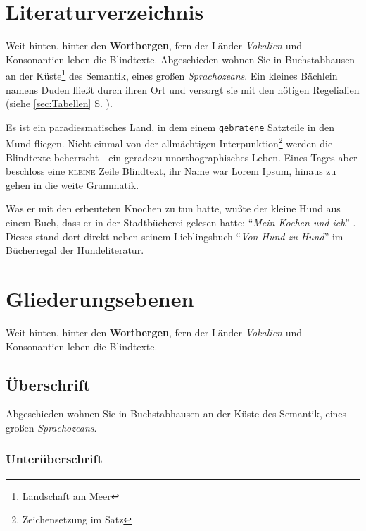 \documentclass[%
	12pt,%
	a4paper,%
	oneside,%
	listof=totoc,
 	index=totoc,
	bibliography = totoc,
	parskip = half,%
	chapterprefix=false,%
	appendixprefix, %
headings=small,%
]{scrreprt}
\begin{document}
\chapter{Literaturverzeichnis}
\label{sec:Literaturverzeichnis}

Weit hinten, hinter den \textbf{Wortbergen}, fern der Länder \textit{Vokalien} und Konsonantien leben die Blindtexte. Abgeschieden wohnen Sie in Buchstabhausen an der Küste\footnote{Landschaft am Meer}
des Semantik, eines großen \textsl{Sprachozeans}. Ein kleines Bächlein namens Duden fließt durch ihren Ort und versorgt sie mit den nötigen Regelialien (siehe \ref{sec:Tabellen} S. \pageref{sec:Tabellen}).

Es ist ein paradiesmatisches Land, in dem einem \texttt{gebratene} Satzteile in den Mund fliegen. Nicht einmal von der allmächtigen Interpunktion\footnote{Zeichensetzung im Satz} werden die Blindtexte beherrscht - ein geradezu unorthographisches Leben. Eines Tages aber beschloss eine \textsc{kleine} Zeile Blindtext, ihr Name war Lorem Ipsum, hinaus zu gehen in die weite Grammatik. 

Was er mit den erbeuteten Knochen zu tun hatte, wußte der kleine Hund aus einem Buch, dass er in der Stadtbücherei
gelesen hatte: "`\emph{Mein Kochen und ich}"' \cite{ansorge:1999}. Dieses stand dort direkt neben seinem Lieblingsbuch
"`\emph{Von Hund zu Hund}"' \cite{balzert:SWT1} im Bücherregal der Hundeliteratur.

\chapter{Gliederungsebenen}
\label{sec:Gliederung}

Weit hinten, hinter den \textbf{Wortbergen}, fern der Länder \textit{Vokalien} und Konsonantien leben die Blindtexte.

\section{Überschrift}

Abgeschieden wohnen Sie in Buchstabhausen an der Küste des Semantik, eines großen \textsl{Sprachozeans}. 

\subsection{Unterüberschrift}
\end{document}
